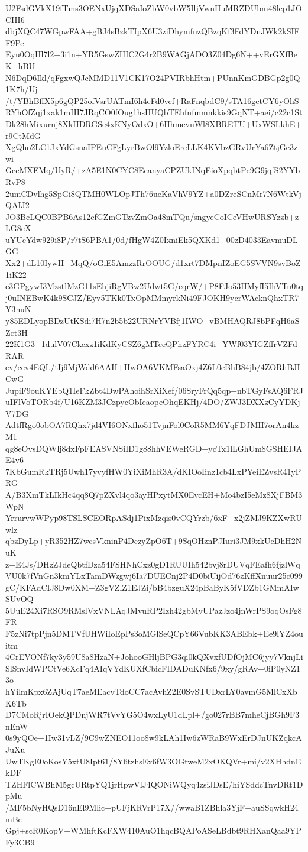 U2FsdGVkX19fTms3OENxUjqXDSaIoZbW0vbW5IljVwnHuMRZDUbm48lep1JOCHI6
dbjXQC47WGpwFAA+gBJ4sBzkTIpX6U3ziDhymfnzQBzqKf3FdYDnJWk2kSIFF9Pe
Eyu0OqHl7l2+3i1n+YR5GswZHIC2G4r2B9WAGjADO3Z04Dg6N++vErGXfBeK+hBU
N6DqD6Ikl/qFgxwQJcMMD11V1CK17O24PVIRbhHtm+PUnnKmGDBGp2g0Q1K7h/Uj
/t/YBhBffX5p6gQP25ofVsrUATmI6h4eFd0vcf+RaFnqbdC9/sTA16gctCY6yOhS
RYhOfZqj1xak1mHI7JRqCO0fOug1hsHUQbTEhfnfmmnkkis9GqNT+aei/c22c1St
Dk28hMixurnj8XkHDRGSe4xKNyOdxO+6HhmevuWl8XBRETU+UxWSLkhE+r9CtMdG
XgQho2LC1JxYdGsnaIPEuCFgLyrBwOl9YzloEreLLK4KVbzGRvUrYa6ZtjGe3zwi
GccMXEMq/UyR/+zA5E1N0CYC8EcanyaCPZUkINqEioXpqbtPc9G9jqfS2YYbRvP8
2umCDvlhg5SpGi8QTMH0WLOpJTh76ueKaVhV9YZ+a0DZreSCnMr7N6WtkVjQAIJ2
JO3BcLQC0BPB6As12cfGZmGTzvZmOa48mTQu/sngyeCoICeVHwURSYzzb+zLG8cX
uYUcYdw929i8P/r7tS6PBA1/0d/fHgW4Z0IxniEk5QXKd1+00zD4033EavmuDLGG
Xx2+dL10IywH+MqQ/oGiE5AmzzRrOOUG/d1xrt7DMpnIZoEG5SVVN9svBoZ1iK22
c3GPgywI3MzstlMzG11sEhjiRgVBw2Udwt5G/cqrW/+P8FJo53HMyfI5IhVTn0tq
j0uINEBwK4k9SCJZ/Eyv5TKk0TxOpMMmyrkNi49FJOKH9ycrWAcknQhxTR7Y3nuN
y85EDLyopBDzUtKSdi7H7n2b5b22URNrYVBfj1IWO+vBMHAQRJ8bPFqH6aSZct3H
22K1G3+1dulV07Ckcxz1iKdKyCSZ6gMTceQPhzFYRC4i+YWf03YIGZffrVZFdRAR
ev/ccv4EQL/tIj9MjWdd6AAH+HwOA6VKMFsaOxj4Z6L0eBhB84jb/4ZORhBJICwG
JupiF9ouKYEbQ1IeFkZbt4DwPAhoihSrXiXef/06SryFrQq5qp+nbTGyFsAQ6FRJ
uIFlVoTORb4f/U16KZM3JCzpycObIeaopeOhqEKHj/4DO/ZWJ3DXXzCyYDKjV7DG
AdtfRgo0obOA7RQhx7jd4VI6ONxfho51TvjnFol0CoR5MM6YqFDJMH7orAn4kzM1
qg8eOvsDQWlj8dxFpFEASVNSiID1g88hhVEWeRGD+ycTx1lLGhUm8GSHEIJAE4v6
7KbGumRkTRj5Uwh17yvyfHW0YiXiMhR3A/dKIOoIinz1cb4LxPYeiEZvsR41yPRG
A/B3XmTkLIkHc4qq8Q7pZXvl4qo3ayHPxytMX0EvcEH+Mo4bzI5eMz8XjFBM3WpN
YrrurvwWPyp98TSLSCEORpASdj1PixMzqis0vCQYrzb/6xF+x2jZMJ9KZXwRUwlz
qbzDyLp+yR352HZ7wcsVkninP4DczyZpO6T+9SqOHznPJIuri3JM9xkUeDhH2NuK
z+E4Js/DHzZJdeQbtfDza54FSHNhCxz0gD1RUUIh542bvj8rDUVqFEafh6fjzlWq
VU0k7fVnGn3kmYLxTamDWzgwj6Ia7DUECnj2P4D0biUijOd76zKffXnuur25c099
gC/KFAdCIJ8Dw0XM+Z3gVZlZ1EJZi/bB4bzguX24pBaByK5fVDZb1GMmAIwSUvOQ
5UuE24Xi7RSO9RMslVxVNLAqJMvuRP2Izh42gbMyUPazJzo4jnWrPS9oqOsFg8FR
F5zNi7tpPjn5DMTVfUHWiIoEpPs3oMGlSeQCpY66VubKK3ABEbk+Ee9lYZ4ouitm
4CrEVONf7ky3y59U8a8HzaN+JohooGHljBPG3qi0kQXvxfUDfOjMC6jyy7VknjLi
SlSnvIdWPCtVe6XcFq4AIqVYdKUXfCbicFIDADuKNfx6/9xy/gRAv+0iP0yNZ13o
hYilmKpx6ZAjUqT7aeMEacvTdoCC7acAvhZ2E0SvSTUDxrLY0avmG5MlCxXbK6Tb
D7CMoRjrIOekQPDnjWR7tVvYG5O4wxLyU1dLpl+/go027rBB7mheCjBGh9F3nEnW
0s9yQOe+1Iw31vLZ/9C9wZNEO11oo8w9kLAh1Iw6zWRaB9WxErDJnUKZqkcAJuXu
UwTKgE0oKosY5xtU8Ipt61/8Y6tzhsEx6fW3OGtweM2xOKQVr+mi/v2XHhdnEkDF
TZHFlCWBhM5gcURtpYQ1jrHpwVlJ4QONiWQyq4zsiJDsE/hiYSddcTnvDRt1DpMu
/MF5bNyHQsD16nEl9Mlic+pUFjKRVrP17X//wwaB1ZBhla3YjF+auSSqwkH24mBc
Gpj+scR0KopV+WMhftKcFXW410AuO1hqcBQAPoASeLBdbt9RHXanQaa9YPFy3CB9
